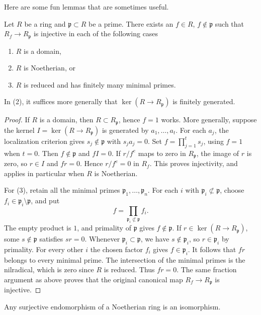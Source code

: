 \noindent
Here are some fun lemmas that are sometimes useful.

\begin{lemma}
\label{editorial-source-lemma-subring-of-local-ring}
Let $R$ be a ring and $\mathfrak p \subset R$ be a prime.
There exists an $f \in R$, $f \not \in \mathfrak p$ such
that $R_f \to R_\mathfrak p$ is injective in each of the
following cases
\begin{enumerate}
\item $R$ is a domain,
\item $R$ is Noetherian, or
\item $R$ is reduced and has finitely many minimal primes.
\end{enumerate}
In (2), it suffices more generally that
$\ker(R\to R_{\mathfrak p})$ is finitely generated.
\end{lemma}

\begin{proof}
If $R$ is a domain, then $R \subset R_\mathfrak p$, hence $f = 1$ works.
More generally, suppose the kernel $I=\ker(R\to R_{\mathfrak p})$
is generated by $a_1,\ldots,a_t$. For each $a_j$, the localization
criterion gives $s_j\notin\mathfrak p$ with $s_ja_j=0$.
Set $f=\prod_{j=1}^ts_j$, using $f=1$ when $t=0$.
Then $f\notin\mathfrak p$ and $fI=0$.
If $r/f^e$ maps to zero in $R_{\mathfrak p}$, the image of $r$
is zero, so $r\in I$ and $fr=0$. Hence $r/f^e=0$ in $R_f$.
This proves injectivity, and applies in particular when $R$ is Noetherian.

\medskip\noindent
For (3), retain all the minimal primes
$\mathfrak p_1,\ldots,\mathfrak p_n$. For each $i$ with
$\mathfrak p_i\not\subset\mathfrak p$, choose
$f_i\in\mathfrak p_i\setminus\mathfrak p$, and put
$$
f=\prod_{\mathfrak p_i\not\subset\mathfrak p}f_i.
$$
The empty product is $1$, and primality of $\mathfrak p$ gives
$f\notin\mathfrak p$. If $r\in\ker(R\to R_{\mathfrak p})$,
some $s\notin\mathfrak p$ satisfies $sr=0$. Whenever
$\mathfrak p_i\subset\mathfrak p$, we have $s\notin\mathfrak p_i$,
so $r\in\mathfrak p_i$ by primality. For every other $i$ the
chosen factor $f_i$ gives $f\in\mathfrak p_i$.
It follows that $fr$ belongs to every minimal prime. The intersection
of the minimal primes is the nilradical, which is zero since $R$
is reduced. Thus $fr=0$. The same fraction argument as above proves
that the original canonical map $R_f\to R_{\mathfrak p}$ is injective.
\end{proof}

\begin{lemma}
\label{editorial-source-lemma-surjective-endo-noetherian-ring-is-iso}
Any surjective endomorphism of a Noetherian ring is an isomorphism.
\end{lemma}

